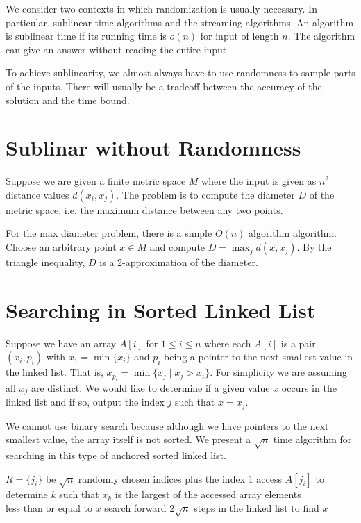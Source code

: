 



We consider two contexts in which randomization is usually necessary. In particular, sublinear time algorithms and the streaming algorithms. An algorithm is sublinear time if its running time is $o(n)$ for input of length $n$. The algorithm can give an answer without reading the entire input.

To achieve sublinearity, we almost always have to use randomness to sample parts of the inputs. There will usually be a tradeoff between the accuracy of the solution and the time bound.

\section{Sublinar without Randomness}

Suppose we are given a finite metric space $M$ where the input is given as $n^2$ distance values $d(x_i,x_j)$. The problem is to compute the diameter $D$ of the metric space, i.e. the maximum distance between any two points.

For the max diameter problem, there is a simple $O(n)$ algorithm algorithm. Choose an arbitrary point $x \in M$ and compute $D = \max_{j} d(x,x_j)$. By the triangle inequality, $D$ is a 2-approximation of the diameter.

\section{Searching in Sorted Linked List}

Suppose we have an array $A[i]$ for $1 \leq i \leq n$ where each $A[i]$ is a pair $(x_i, p_i)$ with $x_1 = \min\{x_i\}$ and $p_i$ being a pointer to the next smallest value in the linked list. That is, $x_{p_i} = \min\{x_j \mid x_j > x_i\}$. For simplicity we are assuming all $x_j$ are distinct. We would like to determine if a given value $x$ occurs in the linked list and if so, output the index $j$ such that $x = x_j$.

We cannot use binary search because although we have pointers to the next smallest value, the array itself is not sorted. We present a $\sqrt{n}$ time algorithm for searching in this type of anchored sorted linked list.

\begin{codebox}
    \li $R = \{j_i\}$ be $\sqrt{n}$ randomly chosen indices plus the index 1
    \li access $A[j_i]$ to determine $k$ such that $x_k$ is the largest of the accessed array elements\\ less than or equal to $x$
    \li search forward $2\sqrt{n}$ steps in the linked list to find $x$
\end{codebox}

